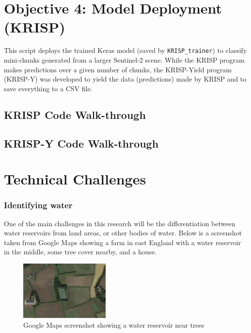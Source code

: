 \section{Objective 4: Model Deployment (KRISP)}
This script deploys the trained Keras model (saved by \verb|KRISP_trainer|) to classify mini-chunks generated from a larger Sentinel-2 scene. While the KRISP program makes predictions over a given number of chunks, the KRISP-Yield program (KRISP-Y) was developed to yield the data (predictions) made by KRISP and to save everything to a CSV file. 

\subsection{KRISP Code Walk-through}

\subsection{KRISP-Y Code Walk-through}

\section{Technical Challenges}
\subsubsection{Identifying water}
One of the main challenges in this research will be the differentiation between water reservoirs from land areas, or other bodies of water. Below is a screenshot taken from Google Maps showing a farm in east England with a water reservoir in the middle, some tree cover nearby, and a house. 

\begin{figure}[H]
\centering
\includegraphics[width=0.4\textwidth]{contents/figures/gmaps screenshot.jpg}
\caption{Google Maps screenshot showing a water reservoir near trees}
\label{fig:NISH}
\end{figure}

